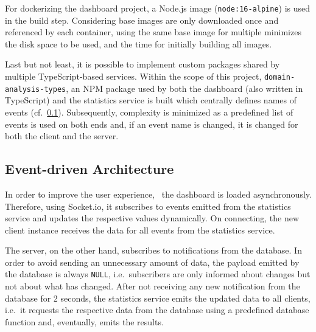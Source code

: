 For dockerizing the dashboard project, a Node.js image (\texttt{node:16-alpine}) is used in the build step.
Considering base images are only downloaded once and referenced by each container, using the same base image for multiple minimizes the disk space to be used, and the time for initially building all images.~\autocite[cf.][pp. 8-9]{Arundel.2019}

Last but not least, it is possible to implement custom packages shared by multiple TypeScript-based services.
Within the scope of this project, \texttt{domain-analysis-types}, an NPM package used by both the dashboard (also written in TypeScript) and the statistics service is built which centrally defines names of events (cf.~\ref{subsec:event-driven-architecture}).
Subsequently, complexity is minimized as a predefined list of events is used on both ends and, if an event name is changed, it is changed for both the client and the server.

\subsection{Event-driven Architecture}\label{subsec:event-driven-architecture}

In order to improve the user experience,~\autocite[cf.][]{Shah.2021} the dashboard is loaded asynchronously.
Therefore, using Socket.io, it subscribes to events emitted from the statistics service and updates the respective values dynamically.
On connecting, the new client instance receives the data for all events from the statistics service.

The server, on the other hand, subscribes to notifications from the database.
In order to avoid sending an unnecessary amount of data, the payload emitted by the database is always \texttt{NULL}, i.e.\ subscribers are only informed about changes but not about what has changed.
After not receiving any new notification from the database for 2 seconds, the statistics service emits the updated data to all clients, i.e.\ it requests the respective data from the database using a predefined database function and, eventually, emits the results.
